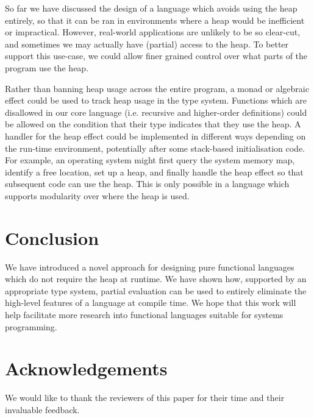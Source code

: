 \documentclass[runningheads]{llncs}
\begin{document}
So far we have discussed the design of a language which avoids using the heap entirely, so that it can be ran in environments where a heap would be inefficient or impractical. However, real-world applications are unlikely to be so clear-cut, and sometimes we may actually have (partial) access to the heap. To better support this use-case, we could allow finer grained control over what parts of the program use the heap.

Rather than banning heap usage across the entire program, a monad or algebraic effect \cite{karachalias2021efficient} could be used to track heap usage in the type system. Functions which are disallowed in our core language (i.e. recursive and higher-order definitions) could be allowed on the condition that their type indicates that they use the heap. A handler for the heap effect could be implemented in different ways depending on the run-time environment, potentially after some stack-based initialisation code. For example, an operating system might first query the system memory map, identify a free location, set up a heap, and finally handle the heap effect so that subsequent code can use the heap. This is only possible in a language which supports modularity over where the heap is used.

\section{Conclusion}

We have introduced a novel approach for designing pure functional languages which do not require the heap at runtime. We have shown how, supported by an appropriate type system, partial evaluation can be used to entirely eliminate the high-level features of a language at compile time. We hope that this work will help facilitate more research into functional languages suitable for systems programming.

\section*{Acknowledgements}

We would like to thank the reviewers of this paper for their time and their invaluable feedback.


\end{document}
